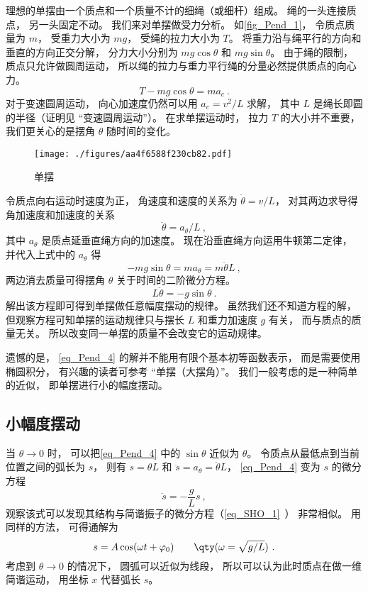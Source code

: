 

理想的单摆由一个质点和一个质量不计的细绳（或细杆）组成。 绳的一头连接质点， 另一头固定不动。 我们来对单摆做受力分析。 如\autoref{fig_Pend_1}， 令质点质量为 $m$， 受重力大小为 $mg$， 受绳的拉力大小为 $T$。 将重力沿与绳平行的方向和垂直的方向正交分解， 分力大小分别为 $mg\cos\theta$ 和 $mg\sin\theta$。 由于绳的限制， 质点只允许做圆周运动， 所以绳的拉力与重力平行绳的分量必然提供质点的向心力。
\begin{equation}
T - mg\cos\theta = ma_c~.
\end{equation}
对于变速圆周运动， 向心加速度仍然可以用 $a_c = v^2/L$ 求解， 其中 $L$ 是绳长即圆的半径（证明见 “变速圆周运动”）。%
在求单摆运动时， 拉力 $T$ 的大小并不重要， 我们更关心的是摆角 $\theta$ 随时间的变化。
\begin{figure}[ht]
\centering
\texttt{[image: ./figures/aa4f6588f230cb82.pdf]}
\caption{单摆} \label{fig_Pend_1}
\end{figure}

令质点向右运动时速度为正， 角速度和速度的关系为 $\dot\theta = v/L$， 对其两边求导得角加速度和加速度的关系
\begin{equation}
\ddot\theta = a_\theta/L~,
\end{equation}
其中 $a_\theta$ 是质点延垂直绳方向的加速度。 现在沿垂直绳方向运用牛顿第二定律， 并代入上式中的 $a_\theta$ 得
\begin{equation}
-mg\sin\theta = ma_\theta = m\ddot\theta L~,
\end{equation}
两边消去质量可得摆角 $\theta$ 关于时间的二阶微分方程。
\begin{equation}\label{eq_Pend_4}
L\ddot\theta = - g\sin\theta~.
\end{equation}
解出该方程即可得到单摆做任意幅度摆动的规律。 虽然我们还不知道方程的解， 但观察方程可知单摆的运动规律只与摆长 $L$ 和重力加速度 $g$ 有关， 而与质点的质量无关。 所以改变同一单摆的质量不会改变它的运动规律。

遗憾的是， \autoref{eq_Pend_4} 的解并不能用有限个基本初等函数表示， 而是需要使用椭圆积分， 有兴趣的读者可参考 “单摆（大摆角）”。 我们一般考虑的是一种简单的近似， 即单摆进行小的幅度摆动。

\subsection{小幅度摆动}
当 $\theta \to 0$ 时， 可以把\autoref{eq_Pend_4} 中的 $\sin\theta$ 近似为 $\theta$。 令质点从最低点到当前位置之间的弧长为 $s$， 则有 $s = \theta L$ 和 $\ddot s = a_\theta = \ddot\theta L$， \autoref{eq_Pend_4} 变为 $s$ 的微分方程
\begin{equation}
\ddot s = - \frac gL s~,
\end{equation}
观察该式可以发现其结构与简谐振子的微分方程（\autoref{eq_SHO_1}~） 非常相似。 用同样的方法， 可得通解为
\begin{equation}
s = A\cos(\omega t + \varphi_0)  \qquad \qty(\omega  = \sqrt{g/L})~.
\end{equation}
考虑到 $\theta \to 0$ 的情况下， 圆弧可以近似为线段， 所以可以认为此时质点在做一维简谐运动， 用坐标 $x$ 代替弧长 $s$。
